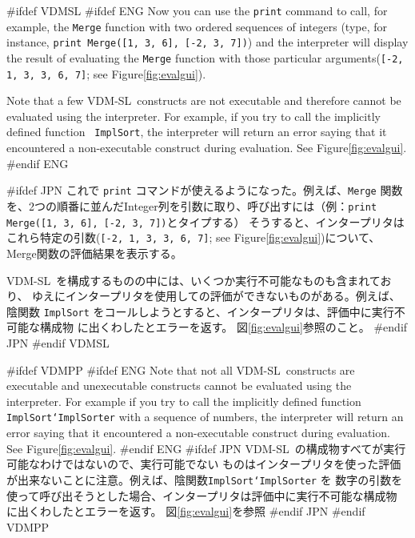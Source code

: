 \documentclass[\pformat,12pt]{article}
\newcommand{\vdmslpp}{VDM-SL}
\newcommand{\vdmslpp}{VDM++}
\newcommand{\aaa}{\tt }
\begin{document}
#ifdef VDMSL 
#ifdef ENG
Now you can use the {\tt print} command to call, for example, the
{\aaa Merge} function with two ordered sequences of integers (type,
for instance, {\tt print Merge([1, 3, 6], [-2, 3, 7])}) and the
interpreter will display the result of evaluating the {\aaa Merge}
function with those particular arguments({\tt [-2, 1, 3, 3, 6, 7]};
see Figure\ref{fig:evalgui}).

Note that a few \vdmslpp\ constructs are not executable and therefore
cannot be evaluated using the interpreter. For example, if you try
to call the implicitly defined function   {\aaa
  ImplSort}, the interpreter will return an error saying that it
encountered a non-executable construct during evaluation.  See Figure\ref{fig:evalgui}. 
#endif ENG

#ifdef JPN
これで {\tt print} コマンドが使えるようになった。例えば、{\aaa Merge} 関数
を、2つの順番に並んだInteger列を引数に取り、呼び出すには（例：{\tt print Merge([1, 3, 6], [-2, 3, 7])}とタイプする）
そうすると、インタープリタはこれら特定の引数({\tt [-2, 1, 3, 3, 6, 7]};
see Figure\ref{fig:evalgui})について、Merge関数の評価結果を表示する。 

 \vdmslpp\ を構成するものの中には、いくつか実行不可能なものも含まれており、
 ゆえにインタープリタを使用しての評価ができないものがある。例えば、陰関数
  {\aaa ImplSort}
 をコールしようとすると、インタープリタは、評価中に実行不可能な構成物
 に出くわしたとエラーを返す。
 図\ref{fig:evalgui}参照のこと。
#endif JPN
#endif VDMSL

#ifdef VDMPP
#ifdef ENG
Note that not all \vdmslpp\ constructs are executable and unexecutable
constructs cannot be evaluated using the interpreter.  For example if
you try to call the implicitly defined function {\aaa
  ImplSort`ImplSorter} with a sequence of numbers, the interpreter
will return an error saying that it encountered a non-executable construct
 during evaluation. See
Figure\ref{fig:evalgui}.
#endif ENG
#ifdef JPN
\vdmslpp\ の構成物すべてが実行可能なわけではないので、実行可能でない
ものはインタープリタを使った評価が出来ないことに注意。例えば、陰関数{\aaa ImplSort`ImplSorter} を
数字の引数を使って呼び出そうとした場合、インタープリタは評価中に実行不可能な構成物
に出くわしたとエラーを返す。
図\ref{fig:evalgui}を参照
#endif JPN
#endif VDMPP
\end{document}
